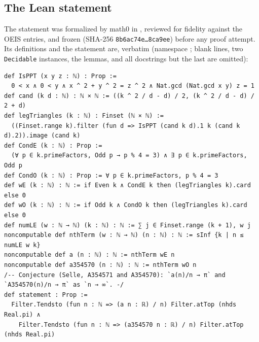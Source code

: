 \documentclass[11pt]{amsart}
\theoremstyle{plain}
\theoremstyle{definition}
\newcommand{\code}[1]{\texttt{#1}}
\begin{document}
\subsection*{The Lean statement}
The statement was formalized by math0 in , reviewed for fidelity against the OEIS entries, and frozen (SHA-256 \texttt{8b6ac74e\ldots 8ca9ee}) before any proof attempt. Its definitions and the statement are, verbatim (namespace ; blank lines, two \code{Decidable} instances, the lemmas, and all docstrings but the last are omitted):
\begin{lstlisting}
def IsPPT (x y z : ℕ) : Prop :=
  0 < x ∧ 0 < y ∧ x ^ 2 + y ^ 2 = z ^ 2 ∧ Nat.gcd (Nat.gcd x y) z = 1
def cand (k d : ℕ) : ℕ × ℕ := ((k ^ 2 / d - d) / 2, (k ^ 2 / d - d) / 2 + d)
def legTriangles (k : ℕ) : Finset (ℕ × ℕ) :=
  ((Finset.range k).filter (fun d => IsPPT (cand k d).1 k (cand k d).2)).image (cand k)
def CondE (k : ℕ) : Prop :=
  (∀ p ∈ k.primeFactors, Odd p → p % 4 = 3) ∧ ∃ p ∈ k.primeFactors, Odd p
def CondO (k : ℕ) : Prop := ∀ p ∈ k.primeFactors, p % 4 = 3
def wE (k : ℕ) : ℕ := if Even k ∧ CondE k then (legTriangles k).card else 0
def wO (k : ℕ) : ℕ := if Odd k ∧ CondO k then (legTriangles k).card else 0
def numLE (w : ℕ → ℕ) (k : ℕ) : ℕ := ∑ j ∈ Finset.range (k + 1), w j
noncomputable def nthTerm (w : ℕ → ℕ) (n : ℕ) : ℕ := sInf {k | n ≤ numLE w k}
noncomputable def a (n : ℕ) : ℕ := nthTerm wE n
noncomputable def a354570 (n : ℕ) : ℕ := nthTerm wO n
/-- Conjecture (Selle, A354571 and A354570): `a(n)/n → π` and `A354570(n)/n → π` as `n → ∞`. -/
def statement : Prop :=
  Filter.Tendsto (fun n : ℕ => (a n : ℝ) / n) Filter.atTop (nhds Real.pi) ∧
    Filter.Tendsto (fun n : ℕ => (a354570 n : ℝ) / n) Filter.atTop (nhds Real.pi)
\end{lstlisting}
\end{document}
